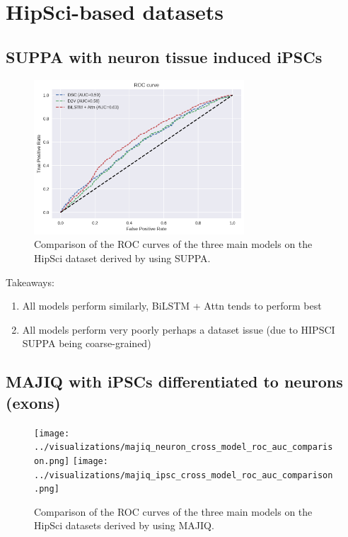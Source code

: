 \section{HipSci-based datasets} \label{sec:hipsci} 

\subsection{SUPPA with neuron tissue induced iPSCs} \label{subsec:hipsci_suppa}

\begin{figure}
	\centering\includegraphics[width=0.7\textwidth]{../visualizations/suppa_cross_model_roc_auc_comparison.png} 
	\caption[bla.]{Comparison of the ROC curves of the three main models on the HipSci dataset derived by using SUPPA. }
	\label{fig:suppa_auc_roc}
\end{figure}

Takeaways:
\begin{enumerate}
	\item All models perform similarly, BiLSTM + Attn tends to perform best
	\item All models perform very poorly perhaps a dataset issue (due to HIPSCI SUPPA being coarse-grained)
\end{enumerate}

\subsection{MAJIQ with iPSCs differentiated to neurons (exons)} \label{sec:hipsci_neuron_majiq}

\begin{figure}
	\centering\texttt{[image: ../visualizations/majiq\_neuron\_cross\_model\_roc\_auc\_comparison.png]} 
	\centering\texttt{[image: ../visualizations/majiq\_ipsc\_cross\_model\_roc\_auc\_comparison.png]} 
	\caption[bla.]{Comparison of the ROC curves of the three main models on the HipSci datasets derived by using MAJIQ. }
	\label{fig:majiq_rocs}
\end{figure}

